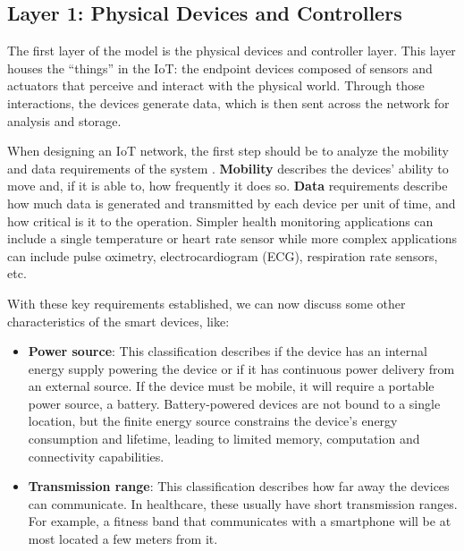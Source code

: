 \subsection{Layer 1: Physical Devices and Controllers}
\label{sec:iot-model-layer1}

The first layer of the model is the physical devices and controller layer. This layer houses the ``things'' in the \acl{IoT}: the endpoint devices composed of sensors and actuators that perceive and interact with the physical world. Through those interactions, the devices generate data, which is then sent across the network for analysis and storage. \bigskip

When designing an \acs {IoT} network, the first step should be to analyze the mobility and data requirements of the system \cite{10.5555/3161403}. \textbf{Mobility} describes the devices' ability to move and, if it is able to, how frequently it does so. \textbf{Data} requirements describe how much data is generated and transmitted by each device per unit of time, and how critical is it to the operation. Simpler health monitoring applications can include a single temperature or heart rate sensor while more complex applications can include pulse oximetry, electrocardiogram (\acs{ECG}), respiration rate sensors, etc. 
\bigskip

With these key requirements established, we can now discuss some other characteristics of the smart devices, like:

\begin{itemize}
    \item \textbf{Power source}: This classification describes if the device has an internal energy supply powering the device or if it has continuous power delivery from an external source. If the device must be mobile, it will require a portable power source, a battery. Battery-powered devices are not bound to a single location, but the finite energy source constrains the device's energy consumption and lifetime, leading to limited memory, computation and connectivity capabilities. 
    \item \textbf{Transmission range}: This classification describes how far away the devices can communicate. In healthcare, these usually have short transmission ranges. For example, a fitness band that communicates with a smartphone will be at most located a few meters from it. 
\end{itemize}

